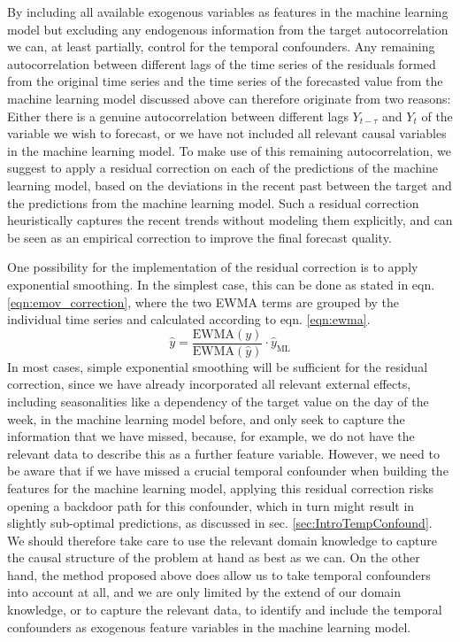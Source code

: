 \documentclass[BCOR=1mm, DIV=calc,10pt,
twoside=true,
twocolumn,
headings=normal]{scrartcl}
\begin{document}
By including all available exogenous variables as features in the machine learning model but excluding any endogenous information from the target autocorrelation we can, at least partially, control for the temporal confounders. Any remaining autocorrelation between different lags of the time series of the residuals formed from the original time series and the time series of the forecasted value from the machine learning model discussed above can therefore originate from two reasons: Either there is a genuine autocorrelation between different lags $Y_{t-\tau}$ and $Y_t$ of the variable we wish to forecast, or we have not included all relevant causal variables in the machine learning model. To make use of this remaining autocorrelation, we suggest to apply a residual correction on each of the predictions of the machine learning model, based on the deviations in the recent past between the target and the predictions from the machine learning model. Such a residual correction heuristically captures the recent trends without modeling them explicitly, and can be seen as an empirical correction to improve the final forecast quality.

One possibility for the implementation of the residual correction is to apply exponential smoothing. In the simplest case, this can be done as stated in eqn. \ref{eqn:emov_correction}, where the two EWMA terms are grouped by the individual time series and calculated according to eqn. \ref{eqn:ewma}.
\begin{equation} \label{eqn:emov_correction}
\hat{y} = \frac{\mathrm{EWMA}(y)}{\mathrm{EWMA}(\hat{y})} \cdot \hat{y}_{\mathrm{ML}}
\end{equation}
In most cases, simple exponential smoothing will be sufficient for the residual correction, since we have already incorporated all relevant external effects, including seasonalities like a dependency of the target value on the day of the week, in the machine learning model before, and only seek to capture the information that we have missed, because, for example, we do not have the relevant data to describe this as a further feature variable. However, we need to be aware that if we have missed a crucial temporal confounder when building the features for the machine learning model, applying this residual correction risks opening a backdoor path for this confounder, which in turn might result in slightly sub-optimal predictions, as discussed in sec. \ref{sec:IntroTempConfound}. We should therefore take care to use the relevant domain knowledge to capture the causal structure of the problem at hand as best as we can. On the other hand, the method proposed above does allow us to take temporal confounders into account at all, and we are only limited by the extend of our domain knowledge, or to capture the relevant data, to identify and include the temporal confounders as exogenous feature variables in the machine learning model.
\end{document}
